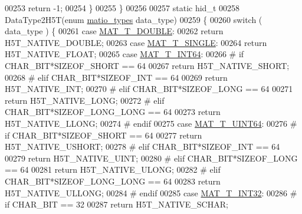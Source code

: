 \begin{DoxyCode}
00253             \textcolor{keywordflow}{return} -1;
00254     \}
00255 \}
00256 
00257 \textcolor{keyword}{static} hid\_t
00258 DataType2H5T(\textcolor{keyword}{enum} \hyperlink{group___m_a_t_gacf7b3b879282b7ab3a51190e49bf3453}{matio\_types} data\_type)
00259 \{
00260     \textcolor{keywordflow}{switch} ( data\_type ) \{
00261         \textcolor{keywordflow}{case} \hyperlink{group___m_a_t_ggacf7b3b879282b7ab3a51190e49bf3453a31e721ecf7e188196f83c32838288797}{MAT\_T\_DOUBLE}:
00262             \textcolor{keywordflow}{return} H5T\_NATIVE\_DOUBLE;
00263         \textcolor{keywordflow}{case} \hyperlink{group___m_a_t_ggacf7b3b879282b7ab3a51190e49bf3453a3a3657d40e9212c923d9b9d03531b64c}{MAT\_T\_SINGLE}:
00264             \textcolor{keywordflow}{return} H5T\_NATIVE\_FLOAT;
00265         \textcolor{keywordflow}{case} \hyperlink{group___m_a_t_ggacf7b3b879282b7ab3a51190e49bf3453a9e825b5d18b8f946eaf2b4b57e51c145}{MAT\_T\_INT64}:
00266 \textcolor{preprocessor}{#       if CHAR\_BIT*SIZEOF\_SHORT == 64}
00267             \textcolor{keywordflow}{return} H5T\_NATIVE\_SHORT;
00268 \textcolor{preprocessor}{#       elif CHAR\_BIT*SIZEOF\_INT == 64}
00269             \textcolor{keywordflow}{return} H5T\_NATIVE\_INT;
00270 \textcolor{preprocessor}{#       elif CHAR\_BIT*SIZEOF\_LONG == 64}
00271             \textcolor{keywordflow}{return} H5T\_NATIVE\_LONG;
00272 \textcolor{preprocessor}{#       elif CHAR\_BIT*SIZEOF\_LONG\_LONG == 64}
00273             \textcolor{keywordflow}{return} H5T\_NATIVE\_LLONG;
00274 \textcolor{preprocessor}{#       endif}
00275         \textcolor{keywordflow}{case} \hyperlink{group___m_a_t_ggacf7b3b879282b7ab3a51190e49bf3453a45547932c46be27118abe08302d7e29f}{MAT\_T\_UINT64}:
00276 \textcolor{preprocessor}{#       if CHAR\_BIT*SIZEOF\_SHORT == 64}
00277             \textcolor{keywordflow}{return} H5T\_NATIVE\_USHORT;
00278 \textcolor{preprocessor}{#       elif CHAR\_BIT*SIZEOF\_INT == 64}
00279             \textcolor{keywordflow}{return} H5T\_NATIVE\_UINT;
00280 \textcolor{preprocessor}{#       elif CHAR\_BIT*SIZEOF\_LONG == 64}
00281             \textcolor{keywordflow}{return} H5T\_NATIVE\_ULONG;
00282 \textcolor{preprocessor}{#       elif CHAR\_BIT*SIZEOF\_LONG\_LONG == 64}
00283             \textcolor{keywordflow}{return} H5T\_NATIVE\_ULLONG;
00284 \textcolor{preprocessor}{#       endif}
00285         \textcolor{keywordflow}{case} \hyperlink{group___m_a_t_ggacf7b3b879282b7ab3a51190e49bf3453a83e06a68320726c6572bfbb9f3addb1d}{MAT\_T\_INT32}:
00286 \textcolor{preprocessor}{#       if CHAR\_BIT == 32}
00287             \textcolor{keywordflow}{return} H5T\_NATIVE\_SCHAR;

\end{DoxyCode}
